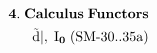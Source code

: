 \documentclass[preview]{standalone}
\begin{document}
\begin{align*}
\special{dvisvgm:raw <g id='unique000'>}\mathbf{4.\;Calculus\;Functors}\\\tilde{\mathrm{d}}|,\;\mathrm{I}_{\mathbf{0}}\;(\text{SM-30..35a})\special{dvisvgm:raw </g>}
\end{align*}
\end{document}
